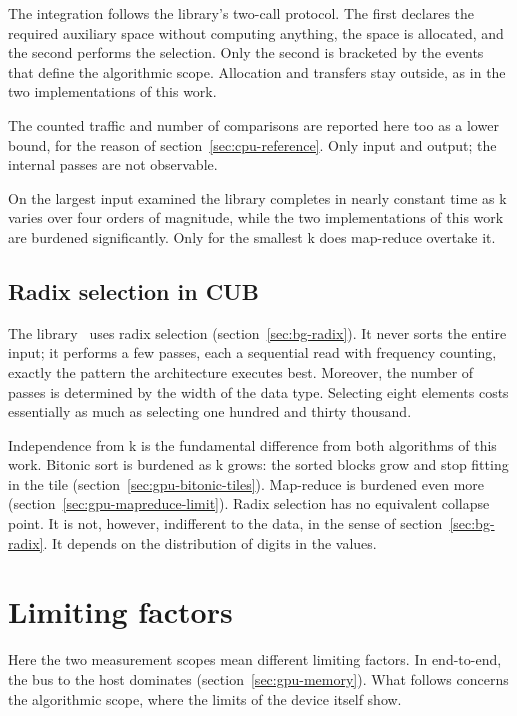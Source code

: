 The integration follows the library's two-call protocol. The first declares the
required auxiliary space without computing anything, the space is allocated,
and the second performs the selection. Only the second is bracketed by the
events that define the algorithmic scope. Allocation and transfers stay
outside, as in the two implementations of this work.

The counted traffic and number of comparisons are reported here too as a lower
bound, for the reason of section~\ref{sec:cpu-reference}. Only input and
output; the internal passes are not observable.

On the largest input examined the library completes in nearly constant time as
k varies over four orders of magnitude, while the two implementations of this
work are burdened significantly. Only for the smallest k does map-reduce
overtake it.

\subsection{Radix selection in CUB}
\label{sec:gpu-reference-cub}

The library~\cite{cccl} uses radix selection (section~\ref{sec:bg-radix}). It
never sorts the entire input; it performs a few passes, each a sequential read
with frequency counting, exactly the pattern the architecture executes best.
Moreover, the number of passes is determined by the width of the data type.
Selecting eight elements costs essentially as much as selecting one hundred and
thirty thousand.

Independence from k is the fundamental difference from both algorithms of this
work. Bitonic sort is burdened as k grows: the sorted blocks grow and stop
fitting in the tile (section~\ref{sec:gpu-bitonic-tiles}). Map-reduce is
burdened even more (section~\ref{sec:gpu-mapreduce-limit}). Radix selection has
no equivalent collapse point. It is not, however, indifferent to the data, in
the sense of section~\ref{sec:bg-radix}. It depends on the distribution of
digits in the values.

\section{Limiting factors}
\label{sec:gpu-bottlenecks}

Here the two measurement scopes mean different limiting factors. In end-to-end,
the bus to the host dominates (section~\ref{sec:gpu-memory}). What follows
concerns the algorithmic scope, where the limits of the device itself show.


